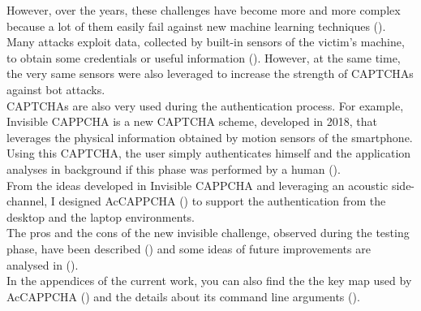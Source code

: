 However, over the years, these challenges have become more and more complex because a lot of them easily fail against new machine learning techniques ().\\
Many attacks exploit data, collected by built-in sensors of the victim's machine, to obtain some credentials or useful information (). However, at the same time, the very same sensors were also leveraged to increase the strength of CAPTCHAs against bot attacks.\\
CAPTCHAs are also very used during the authentication process. For example, Invisible CAPPCHA is a new CAPTCHA scheme, developed in 2018, that leverages the physical information obtained by motion sensors of the smartphone\cite{Invisible_CAPPCHA}. Using this CAPTCHA, the user simply authenticates himself and the application analyses in background if this phase was performed by a human ().\\
From the ideas developed in Invisible CAPPCHA and leveraging an acoustic side-channel, I designed AcCAPPCHA () to support the authentication from the desktop and the laptop environments.\\
The pros and the cons of the new invisible challenge, observed during the testing phase, have been described () and some ideas of future improvements are analysed in ().\\
In the appendices of the current work, you can also find the the key map used by AcCAPPCHA () and the details about its command line arguments ().